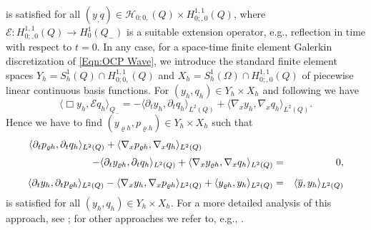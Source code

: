 \documentclass{article}
\numberwithin{equation}{section}
\begin{document}
is satisfied for all 
$(y_,q) \in {\mathcal{H}}_{0;0,}(Q) \times H^{1,1}_{0;,0}(Q)$,
where ${\mathcal{E}} : H^{1,1}_{0;,0}(Q) \to H^1_0(Q_-)$ is a suitable
extension operator, e.g., reflection in time with respect to $t=0$.
In any case, for a space-time finite element Galerkin 
discretization
of \eqref{Eqn:OCP Wave}, 
we introduce the standard finite
element spaces $Y_h = S_h^1(Q) \cap H^{1,1}_{0;0,}(Q)$
and $X_h = S_h^1(\Omega) \cap H^{1,1}_{0;,0}(Q)$ of piecewise linear
continuous basis functions. For $(y_h,q_h) \in Y_h \times X_h$ and
following \cite[Lemma 3.5]{SteinbachZank:2022} we have
\[
  \langle \Box y_h , {\mathcal{E}} q_h \rangle_{Q_-}
  = - \langle \partial_t y_h , \partial_t q_h \rangle_{L^2(Q)} +
  \langle \nabla_x y_h , \nabla_x q_h \rangle_{L^2(Q)} .
\]
Hence we have to find
$(y_{\varrho h}, p_{\varrho h}) \in Y_h \times X_h$ such that
\begin{eqnarray*}
  \langle \partial_t p_{\varrho h} , \partial_t q_h \rangle_{L^2(Q)} +
  \langle \nabla_x p_{\varrho h} , \nabla_x q_h \rangle_{L^2(Q)}
  \hspace*{2.5cm}
  && \\[1mm]
     - \langle \partial_t y_{\varrho h} , \partial_t q_h \rangle_{L^2(Q)} +     
  \langle \nabla_x y_{\varrho h} , \nabla_x q_h \rangle_{L^2(Q)}
  & = & 0, \\[2mm]
  \langle \partial_t y_h , \partial_t p_{\varrho h} \rangle_{L^2(Q)} -     
  \langle \nabla_x y_h , \nabla_x p_{\varrho h} \rangle_{L^2(Q)} +
  \langle y_{\varrho h} , y_h \rangle_{L^2(Q)}
  & = & \langle \overline{y} , y_h \rangle_{L^2(Q)}
\end{eqnarray*}
is satisfied for all $(y_h,q_h) \in Y_h \times X_h$. For a more detailed
analysis of this approach, see \cite{LoescherSteinbach:2022SINUM};
for other approaches we refer to, e.g., 
\cite{GugatKeimerLeugering:2009,KroenerKunischVexler:2011,
  MontanerMuench:2019,PeraltaKunisch:2022,Zuazua:2005}.
  
%
%
%
\end{document}
